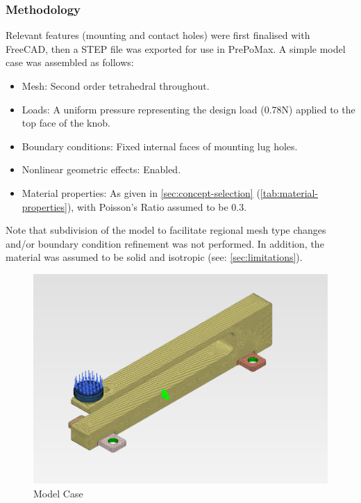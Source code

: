 \documentclass[10pt]{article}
\begin{document}
\subsubsection{Methodology}
Relevant features (mounting and contact holes) were first finalised with FreeCAD, then a STEP file
was exported for use in PrePoMax. A simple model case was assembled as follows:
\begin{itemize}[leftmargin=*]
	\item Mesh: Second order tetrahedral throughout.
	\item Loads: A uniform pressure representing the design load (0.78N) applied to the top face of the knob.
	\item Boundary conditions: Fixed internal faces of mounting lug holes.
	\item Nonlinear geometric effects: Enabled.
	\item Material properties: As given in \autoref{sec:concept-selection}
	      (\autoref{tab:material-properties}), with Poisson's Ratio assumed to be 0.3.
\end{itemize}

Note that subdivision of the model to facilitate regional mesh type changes and/or boundary
condition refinement was not performed. In addition, the material was assumed to be solid and
isotropic (see: \autoref{sec:limitations}).

\begin{figure}[H]
	\centering
	\includegraphics[width=\textwidth]{./assets/11-model-case.png}
	\caption{Model Case}
	\label{fig:model-case}
\end{figure}
\end{document}
